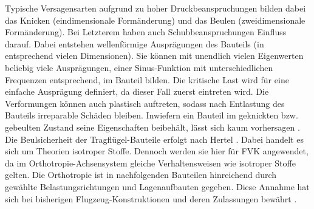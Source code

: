 \noindent Typische Versagensarten aufgrund zu hoher Druckbeanspruchungen bilden dabei das Knicken (eindimensionale Formänderung) und das Beulen (zweidimensionale Formänderung). Bei Letzterem haben auch Schubbeanspruchungen Einfluss darauf. Dabei entstehen wellenförmige Ausprägungen des Bauteils (in entsprechend vielen Dimensionen). Sie können mit unendlich vielen Eigenwerten beliebig viele Ausprägungen, einer Sinus-Funktion mit unterschiedlichen Frequenzen entsprechend, im Bauteil bilden. Die kritische Last wird für eine einfache Ausprägung definiert, da dieser Fall zuerst eintreten wird. Die Verformungen können auch plastisch auftreten, sodass nach Entlastung des Bauteils irreparable Schäden bleiben. Inwiefern ein Bauteil im geknickten bzw. gebeulten Zustand seine Eigenschaften beibehält, lässt sich kaum vorhersagen \cite{item16}.\\

\noindent Die Beulsicherheit der Tragflügel-Bauteile erfolgt nach Hertel \cite{item1}. Dabei handelt es sich um Theorien isotroper Stoffe. Dennoch werden sie hier für FVK angewendet, da im Orthotropie-Achsensystem gleiche Verhaltensweisen wie isotroper Stoffe gelten. Die Orthotropie ist in nachfolgenden Bauteilen hinreichend durch gewählte Belastungsrichtungen und Lagenaufbauten gegeben. Diese Annahme hat sich bei bisherigen Flugzeug-Konstruktionen und deren Zulassungen bewährt \cite{item21}.\\

